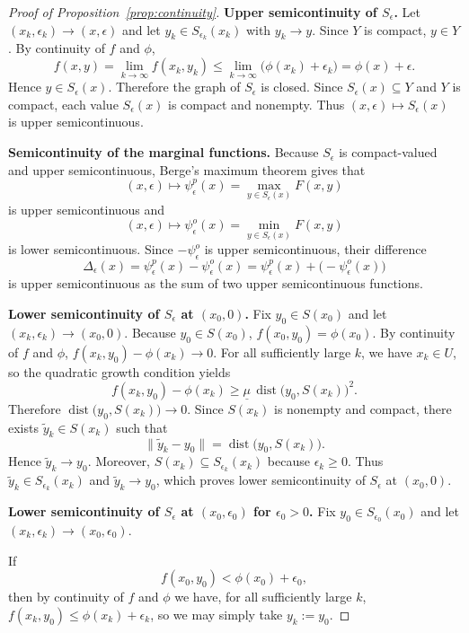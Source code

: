 \documentclass[10pt,a4paper]{amsart}
\DeclareMathOperator{\dist}{dist}
\newcommand{\eps}{\epsilon}
\begin{document}
\begin{proof}[Proof of Proposition~\ref{prop:continuity}]
\textbf{Upper semicontinuity of $S_\eps$.}
Let $(x_k,\eps_k)\to(x,\eps)$ and let $y_k\in S_{\eps_k}(x_k)$
with $y_k\to y$. Since $Y$ is compact, $y\in Y$. By continuity of
$f$ and $\phi$,
\[
f(x,y)=\lim_{k\to\infty}f(x_k,y_k)
\le \lim_{k\to\infty}\bigl(\phi(x_k)+\eps_k\bigr)
= \phi(x)+\eps.
\]
Hence $y\in S_\eps(x)$. Therefore the graph of $S_\eps$ is
closed. Since $S_\eps(x)\subseteq Y$ and $Y$ is compact, each
value $S_\eps(x)$ is compact and nonempty. Thus
$(x,\eps)\mapsto S_\eps(x)$ is upper semicontinuous.

\medskip
\textbf{Semicontinuity of the marginal functions.}
Because $S_\eps$ is compact-valued and upper semicontinuous, Berge's
maximum theorem gives that
\[
(x,\eps)\mapsto \psi_\eps^p(x)=\max_{y\in S_\eps(x)}F(x,y)
\]
is upper semicontinuous and
\[
(x,\eps)\mapsto \psi_\eps^o(x)=\min_{y\in S_\eps(x)}F(x,y)
\]
is lower semicontinuous. Since $-\psi_\eps^o$ is upper
semicontinuous, their difference
\[
\Delta_\eps(x)=\psi_\eps^p(x)-\psi_\eps^o(x)
=\psi_\eps^p(x)+\bigl(-\psi_\eps^o(x)\bigr)
\]
is upper semicontinuous as the sum of two upper semicontinuous
functions.

\medskip
\textbf{Lower semicontinuity of $S_\eps$ at $(x_0,0)$.}
Fix $y_0\in S(x_0)$ and let $(x_k,\eps_k)\to(x_0,0)$.
Because $y_0\in S(x_0)$, $f(x_0,y_0)=\phi(x_0)$.
By continuity of $f$ and $\phi$, $f(x_k,y_0)-\phi(x_k)\to 0$.
For all sufficiently large $k$, we have $x_k\in U$, so the quadratic
growth condition yields
\[
f(x_k,y_0)-\phi(x_k)
\ge \underline\mu\,\dist\bigl(y_0,S(x_k)\bigr)^2.
\]
Therefore $\dist\bigl(y_0,S(x_k)\bigr)\to 0$.
Since $S(x_k)$ is nonempty and compact, there exists
$\tilde y_k\in S(x_k)$ such that
\[
\|\tilde y_k-y_0\|=\dist\bigl(y_0,S(x_k)\bigr).
\]
Hence $\tilde y_k\to y_0$. Moreover, $S(x_k)\subseteq S_{\eps_k}(x_k)$
because $\eps_k\ge 0$. Thus $\tilde y_k\in S_{\eps_k}(x_k)$ and
$\tilde y_k\to y_0$, which proves lower semicontinuity of
$S_\eps$ at $(x_0,0)$.

\medskip
\textbf{Lower semicontinuity of $S_\eps$ at $(x_0,\eps_0)$ for
$\eps_0>0$.}
Fix $y_0\in S_{\eps_0}(x_0)$ and let $(x_k,\eps_k)\to(x_0,\eps_0)$.

If
\[
f(x_0,y_0)<\phi(x_0)+\eps_0,
\]
then by continuity of $f$ and $\phi$ we have, for all sufficiently
large $k$, $f(x_k,y_0)\le \phi(x_k)+\eps_k$, so we may simply take $y_k:=y_0$.


\end{proof}
\end{document}
